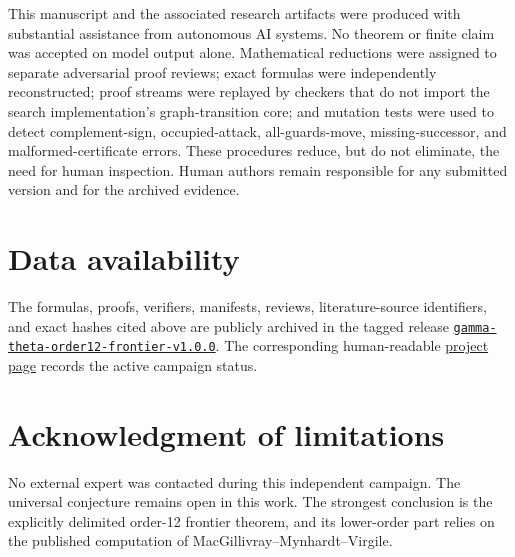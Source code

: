 \documentclass[11pt]{article}
\theoremstyle{definition}
\theoremstyle{remark}
\begin{document}
This manuscript and the associated research artifacts were produced with
substantial assistance from autonomous AI systems.  No theorem or finite
claim was accepted on model output alone.  Mathematical reductions were
assigned to separate adversarial proof reviews; exact formulas were
independently reconstructed; proof streams were replayed by checkers that
do not import the search implementation's graph-transition core; and
mutation tests were used to detect complement-sign, occupied-attack,
all-guards-move, missing-successor, and malformed-certificate errors.
These procedures reduce, but do not eliminate, the need for human
inspection.  Human authors remain responsible for any submitted version
and for the archived evidence.

\section*{Data availability}

The formulas, proofs, verifiers, manifests, reviews,
literature-source identifiers, and exact hashes cited above are publicly
archived in the tagged release
\href{https://github.com/AlecKriebel/Math/releases/tag/gamma-theta-order12-frontier-v1.0.0}
{\texttt{gamma-theta-order12-frontier-v1.0.0}}.
The corresponding human-readable
\href{https://aleckriebel.github.io/Math/research/gamma-theta-conjecture/}
{project page} records the active campaign status.

\section*{Acknowledgment of limitations}

No external expert was contacted during this independent campaign.  The
universal conjecture remains open in this work.  The strongest conclusion
is the explicitly delimited order-12 frontier theorem, and its lower-order
part relies on the published computation of
MacGillivray--Mynhardt--Virgile.



\end{document}
